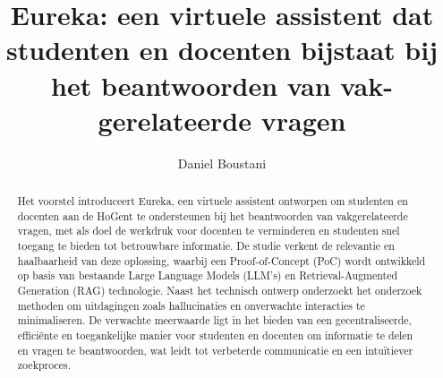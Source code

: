 \documentclass{hogent-article}
\title{Eureka: een virtuele assistent dat studenten en docenten bijstaat bij het beantwoorden van vak-gerelateerde vragen}
\author{Daniel Boustani}
\begin{document}
\begin{abstract}
  Het voorstel introduceert Eureka, een virtuele assistent ontworpen om studenten en docenten aan de HoGent te ondersteunen bij het beantwoorden van vakgerelateerde vragen, met als doel de werkdruk voor docenten te verminderen en studenten snel toegang te bieden tot betrouwbare informatie. De studie verkent de relevantie en haalbaarheid van deze oplossing, waarbij een Proof-of-Concept (PoC) wordt ontwikkeld op basis van bestaande Large Language Models (LLM's) en Retrieval-Augmented Generation (RAG) technologie. Naast het technisch ontwerp onderzoekt het onderzoek methoden om uitdagingen zoals hallucinaties en onverwachte interacties te minimaliseren. De verwachte meerwaarde ligt in het bieden van een gecentraliseerde, efficiënte en toegankelijke manier voor studenten en docenten om informatie te delen en vragen te beantwoorden, wat leidt tot verbeterde communicatie en een intuïtiever zoekproces.
\end{abstract}

\tableofcontents



\printbibliography[heading=bibintoc]
\end{document}
